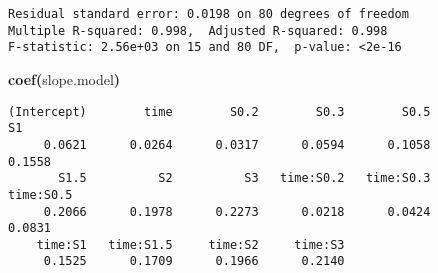 \documentclass{article}\usepackage{graphicx, color}
\makeatletter
\newcommand{\hlfunctioncall}[1]{\textcolor[rgb]{0.501960784313725,0,0.329411764705882}{\textbf{#1}}}%
\newcommand{\hlkeyword}[1]{\textcolor[rgb]{0,0,0}{\textbf{#1}}}%
\newcommand{\hlsymbol}[1]{\textcolor[rgb]{0,0,0}{#1}}%
\newenvironment{kframe}{%
 \def\FrameCommand##1{\hskip\@totalleftmargin \hskip-\fboxsep
 \colorbox{shadecolor}{##1}\hskip-\fboxsep
     \hskip-\linewidth \hskip-\@totalleftmargin \hskip\columnwidth}%
 \MakeFramed {\advance\hsize-\width
   \@totalleftmargin\z@ \linewidth\hsize
   \@setminipage}}%
 {\par\unskip\endMakeFramed}
\newenvironment{knitrout}{}{} %
\makeatother
\begin{document}
\begin{knitrout}
\begin{kframe}
\begin{verbatim}
Residual standard error: 0.0198 on 80 degrees of freedom
Multiple R-squared: 0.998,	Adjusted R-squared: 0.998 
F-statistic: 2.56e+03 on 15 and 80 DF,  p-value: <2e-16 

\end{verbatim}
\begin{flushleft}
\ttfamily\noindent
\hlfunctioncall{coef}\hlkeyword{(}\hlsymbol{slope.model}\hlkeyword{)}\mbox{}
\normalfont
\end{flushleft}
\begin{verbatim}
(Intercept)        time        S0.2        S0.3        S0.5          S1 
     0.0621      0.0264      0.0317      0.0594      0.1058      0.1558 
       S1.5          S2          S3   time:S0.2   time:S0.3   time:S0.5 
     0.2066      0.1978      0.2273      0.0218      0.0424      0.0831 
    time:S1   time:S1.5     time:S2     time:S3 
     0.1525      0.1709      0.1966      0.2140 
\end{verbatim}
\end{kframe}
\end{knitrout}
\end{document}
